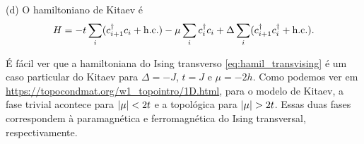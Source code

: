 \documentclass[a4paper,10pt]{article}
\begin{document}
\n

(d) O hamiltoniano de Kitaev é
$$
H = -t \sum_{i} (c_{i+1}^\dagger c_i + \text{h.c.}) - \mu \sum_{i} c_i^\dagger c_i
+ \Delta \sum_{i} (c_{i+1}^\dagger c_i^\dagger + \text{h.c.}).
$$

É fácil ver que a hamiltoniana do Ising transverso \ref{eq:hamil_transvising} é um caso particular do Kitaev para $\Delta = -J$, $t = J$ e $\mu = -2h$. Como podemos ver em \url{https://topocondmat.org/w1_topointro/1D.html}, para o modelo de Kitaev, a fase trivial acontece para $\abs{\mu} < 2t$ e a topológica para $\abs{\mu} > 2t$. Essas duas fases correspondem à paramagnética e ferromagnética do Ising transversal, respectivamente.



%
%
\end{document}
